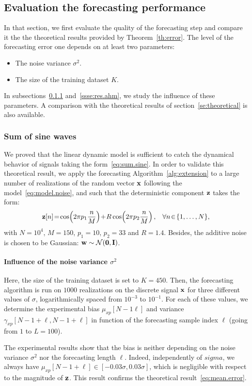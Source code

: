 \subsection{Evaluation the forecasting performance}
In that section, we first evaluate the quality of the forecasting step and compare it the the theoretical results provided by Theorem~\ref{th:error}. The level of the forecasting error one depends on at least two parameters:
\begin{itemize}
\item The noise variance $\sigma^2$.
\item The size of the training dataset $K$. 
\end{itemize}
In subsections~\ref{ssse:res.sine} and~\ref{ssse:res.ahm}, we study the influence of these parameters. A comparison with the theoretical results of section~\ref{se:theoretical} is also available.

\subsubsection{Sum of sine waves}
\label{ssse:res.sine}
We proved that the linear dynamic model is sufficient to catch the dynamical behavior of signals taking the form~\eqref{eq:sum.sine}. In order to validate this theoretical result, we apply the forecasting Algorithm~\ref{alg:extension} to a large number of realizations of the random vector ${\mathbf x}$ following the model~\eqref{eq:model.noise}, and such that the deterministic component ${\mathbf z}$ takes the form:
\[
\bz[n]\! =\!\cos\!\left(2\pi p_1 \dfrac{n}{M} \right)\! +\! R\cos\!\left(2\pi p_2 \dfrac{n}{M} \right),\quad \!\forall n\!\in\!\{1,\ldots,N\},
\]
with $N=10^4$, $M=150$, $p_1=10$, $p_2=33$ and $R=1.4$. Besides, the additive noise is chosen to be Gaussian: ${\mathbf w}\sim{\mathcal N}(\boldsymbol{0},{\mathbf I})$.

\paragraph{Influence of the noise variance $\sigma^2$} Here, the size of the training dataset is set to $K=450$. Then, the forecasting algorithm is run on $1000$ realizations on the discrete signal ${\mathbf x}$ for three different values of $\sigma$, logarithmically spaced from $10^{-3}$ to $10^{-1}$. For each of these values, we determine the experimental bias $\mu_{xp}[N-1\ell]$ and variance $\gamma_{xp}[N-1+\ell,N-1+\ell]$ in function of the forecasting sample index $\ell$ (going from $1$ to $L=100$).

The experimental results show that the bias is neither depending on the noise variance $\sigma^2$ nor the forecasting length $\ell$. Indeed, independently of $sigma$, we always have $\mu_{xp}[N-1+\ell]\in\left[-0.03\sigma,0.03\sigma\right]$, which is negligible with respect to the magnitude of ${\mathbf z}$. This result confirms the theoretical result~\eqref{eq:mean.error}. 

